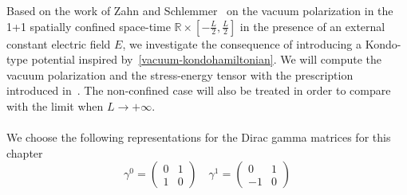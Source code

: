 Based on the work of Zahn and Schlemmer~\cite{Zahn2015} on the vacuum polarization in the 1+1 spatially confined space-time $\mathbb{R}\times[-\frac{L}{2}, \frac L 2]$ in the presence of an external constant electric field $E$,
we investigate the consequence of introducing a Kondo-type potential inspired by~\cref{vacuum-kondohamiltonian}.
We will compute the vacuum polarization and the stress-energy tensor with the prescription introduced in~\cite{Zahn2015}.
The non-confined case will also be treated in order to compare with the limit when $L\rightarrow +\infty$.\\\\
We choose the following representations for the Dirac gamma matrices for this chapter
\begin{equation*}
\gamma^0 = \begin{pmatrix}
0 & 1 \\
1 & 0 \end{pmatrix}  \quad  \gamma^1 = \begin{pmatrix}
0  & 1 \\
-1 & 0
\end{pmatrix}
\end{equation*}
%
